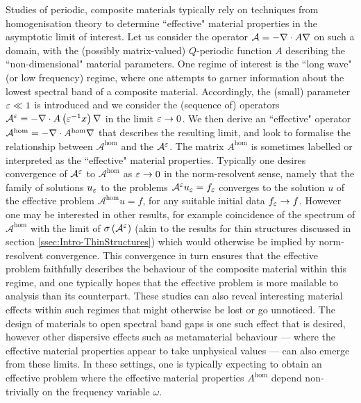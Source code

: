 Studies of periodic, composite materials typically rely on techniques from homogenisation theory to determine ``effective" material properties in the asymptotic limit of interest.
Let us consider the operator $\mathcal{A}=-\nabla\cdot A\nabla$ on such a domain, with the (possibly matrix-valued) $Q$-periodic function $A$ describing the ``non-dimensional" material parameters.
One regime of interest is the ``long wave" (or low frequency) regime, where one attempts to garner information about the lowest spectral band of a composite material.
Accordingly, the (small) parameter $\varepsilon\ll 1$ is introduced and we consider the (sequence of) operators $\mathcal{A}^{\varepsilon} = -\nabla\cdot A\left( \varepsilon^{-1}x \right)\nabla$ in the limit $\varepsilon\rightarrow0$.
We then derive an ``effective" operator $\mathcal{A}^{\mathrm{hom}} = -\nabla\cdot A^{\mathrm{hom}}\nabla$ that describes the resulting limit, and look to formalise the relationship between $\mathcal{A}^{\mathrm{hom}}$ and the $\mathcal{A}^{\varepsilon}$.
The matrix $A^{\mathrm{hom}}$ is sometimes labelled or interpreted as the ``effective" material properties.
Typically one desires convergence of $\mathcal{A}^{\varepsilon}$ to $\mathcal{A}^{\mathrm{hom}}$ as $\varepsilon\rightarrow0$ in the norm-resolvent sense, namely that the family of solutions $u_{\varepsilon}$ to the problems $\mathcal{A}^{\varepsilon}u_{\varepsilon}=f_{\varepsilon}$ converges to the solution $u$ of the effective problem $\mathcal{A}^{\mathrm{hom}}u = f$, for any suitable initial data $f_{\varepsilon}\rightarrow f$.
However one may be interested in other results, for example coincidence of the spectrum of $\mathcal{A}^{\mathrm{hom}}$ with the limit of $\sigma\left( \mathcal{A}^{\varepsilon} \right)$ (akin to the results for thin structures discussed in section \ref{ssec:Intro-ThinStructures}) which would otherwise be implied by norm-resolvent convergence.
This convergence in turn ensures that the effective problem faithfully describes the behaviour of the composite material within this regime, and one typically hopes that the effective problem is more mailable to analysis than its counterpart.
These studies can also reveal interesting material effects within such regimes that might otherwise be lost or go unnoticed.
The design of materials to open spectral band gaps is one such effect that is desired, however other dispersive effects such as metamaterial behaviour --- where the effective material properties appear to take unphysical values --- can also emerge from these limits.
In these settings, one is typically expecting to obtain an effective problem where the effective material properties $A^{\mathrm{hom}}$ depend non-trivially on the frequency variable $\omega$.

